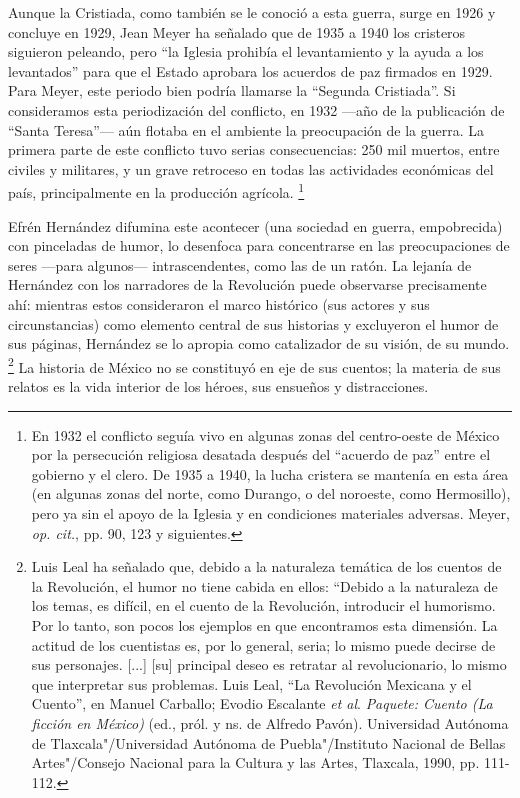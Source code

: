\documentclass[14pt,twoside,final]{extbook} %
\let\oldfootnote\footnote
\renewcommand\footnote[1]{%
\oldfootnote{\hspace{1mm}#1}}
\begin{document}
Aunque la Cristiada, como también se le conoció a esta guerra, surge en 1926 y concluye en 1929, Jean Meyer ha señalado que de 1935 a 1940 los cristeros siguieron peleando, pero ``la Iglesia prohibía el levantamiento y la ayuda a los levantados'' para que el Estado aprobara los acuerdos de paz firmados en 1929. Para Meyer, este periodo bien podría llamarse la ``Segunda Cristiada''. Si consideramos esta
periodización del conflicto, en 1932 ---año de la publicación de ``Santa Teresa''--- aún flotaba en el ambiente la preocupación de la guerra. La primera parte de este conflicto tuvo serias consecuencias: 250 mil muertos, entre civiles y militares, y un grave retroceso en todas las actividades económicas del país, principalmente en la producción agrícola.\footnote{En 1932 el conflicto seguía vivo en algunas zonas del centro-oeste de México por la persecución religiosa desatada después del ``acuerdo de paz'' entre el gobierno y el clero. De 1935 a 1940, la lucha cristera se mantenía en esta área (en algunas zonas del norte, como Durango, o del noroeste, como Hermosillo), pero ya sin el apoyo de la Iglesia y en condiciones materiales adversas. Meyer, \emph{op. cit.}, pp. 90, 123 y siguientes.}

Efrén Hernández difumina este acontecer (una sociedad en guerra, empobrecida) con pinceladas de humor, lo desenfoca para concentrarse en las preocupaciones de seres ---para algunos--- intrascendentes, como las de un ratón. La lejanía de Hernández con los narradores de la Revolución puede observarse precisamente ahí: mientras estos consideraron el marco histórico (sus actores y sus circunstancias) como elemento central de sus historias y excluyeron el humor de sus páginas, Hernández se lo apropia como catalizador de su visión, de su mundo.\footnote{Luis Leal ha señalado que, debido a la naturaleza temática de los cuentos de la Revolución, el humor no tiene cabida en ellos: ``Debido a la naturaleza de los temas, es difícil, en el cuento de la Revolución, introducir el humorismo. Por lo tanto, son pocos los ejemplos en que encontramos esta dimensión. La actitud de los cuentistas es, por lo general, seria; lo mismo puede decirse de sus personajes. [...] [su] principal deseo es retratar al revolucionario, lo mismo que interpretar sus problemas. Luis Leal, ``La Revolución Mexicana y el Cuento'', en Manuel Carballo; Evodio Escalante \emph{et al}. \emph{Paquete: Cuento (La ficción en México)} (ed., pról. y ns. de Alfredo Pavón). Universidad Autónoma de Tlaxcala"/Universidad Autónoma de Puebla"/Instituto Nacional de Bellas Artes"/Consejo Nacional para la Cultura y las Artes, Tlaxcala, 1990, pp. 111-112.} La historia de México no se constituyó en eje de sus cuentos; la materia de sus relatos es la vida interior de los héroes, sus ensueños y distracciones.
\end{document}
